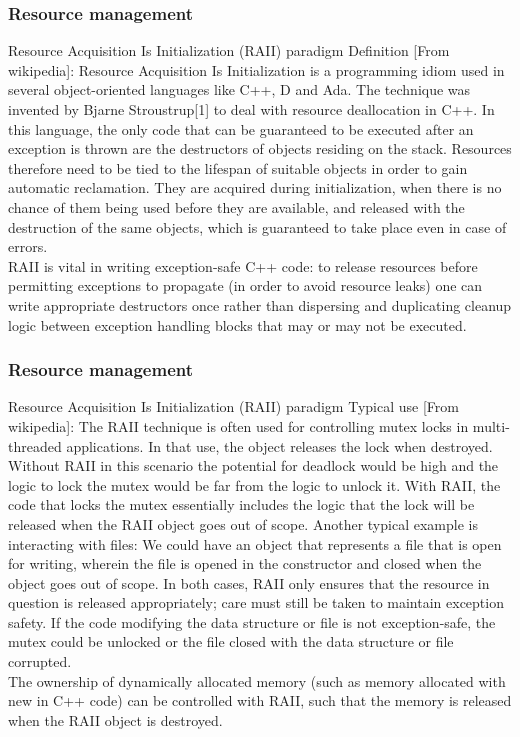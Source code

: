 \documentclass[8pt]{beamer}
\begin{document}
\begin{frame}
  \frametitle{Resource management}
  \begin{block}{Resource Acquisition Is Initialization (RAII) paradigm}
    Definition [From wikipedia]: \alert{Resource Acquisition Is Initialization} is a \alert{programming idiom} used in several object-oriented languages like C++, D and Ada. The technique was invented by Bjarne Stroustrup[1] \alert{to deal with resource deallocation in C++}. In this language, the only code that can be guaranteed to be executed after an exception is thrown are the destructors of objects residing on the stack. \alert{Resources} therefore \alert{need to be tied to the lifespan of suitable objects in order to gain automatic reclamation}. They are \alert{acquired during initialization}, when there is no chance of them being used before they are available, and \alert{released with the destruction} of the same objects, which is guaranteed to take place even in case of errors.\\

    \alert{RAII is vital in writing exception-safe C++ code}: to release resources before permitting exceptions to propagate (in order to avoid resource leaks) one can write appropriate destructors once rather than dispersing and duplicating cleanup logic between exception handling blocks that may or may not be executed.
  \end{block}
\end{frame}
\begin{frame}
  \frametitle{Resource management}
  \begin{block}{Resource Acquisition Is Initialization (RAII) paradigm}
    Typical use [From wikipedia]: The \alert{RAII technique} is often used for \alert{controlling mutex locks in multi-threaded applications}. In that use, the object releases the lock when destroyed. Without RAII in this scenario the potential for deadlock would be high and the logic to lock the mutex would be far from the logic to unlock it. With RAII, the code that locks the mutex essentially includes the logic that the lock will be released when the RAII object goes out of scope. Another typical example is \alert{interacting with files}: We could have an object that represents a file that is open for writing, wherein the file is opened in the constructor and closed when the object goes out of scope. In both cases, RAII only ensures that the resource in question is released appropriately; care must still be taken to maintain exception safety. If the code modifying the data structure or file is not exception-safe, the mutex could be unlocked or the file closed with the data structure or file corrupted.\\
    \alert{The ownership of dynamically allocated memory} (such as memory allocated with new in C++ code) \alert{can be controlled with RAII}, such that the memory is released when the RAII object is destroyed.
  \end{block}
\end{frame}
\end{document}
